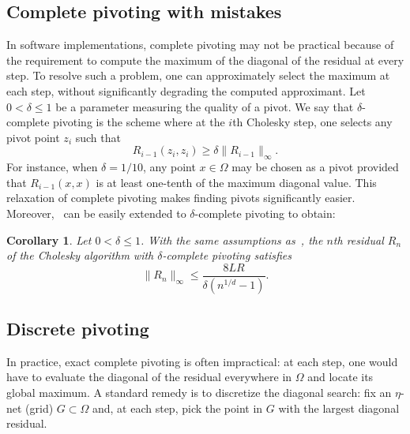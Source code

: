 \documentclass{amsart}
\newtheorem{corollary}{Corollary}[section]
\theoremstyle{definition}
\theoremstyle{remark}
\begin{document}
\subsection{Complete pivoting with mistakes}\label{sec:completePivotingWithMistakes}
In software implementations, complete pivoting may not be practical because of the requirement to compute the maximum of the diagonal of the residual at every step. To resolve such a problem, one can approximately select the maximum at each step, without significantly degrading the computed approximant.
Let $0<\delta\leq 1$ be a parameter measuring the quality of a pivot. We say that $\delta$-complete pivoting is the scheme where at the $i$th Cholesky step, one selects any pivot point $z_i$ such that 
\[
R_{i-1}(z_i, z_i) \geq \delta \| R_{i-1}\|_{\infty}.
\]
For instance, when $\delta=1/10$, any point $x\in\Omega$ may be chosen as a pivot provided that $R_{i-1}(x,x)$ is at least one-tenth of the maximum diagonal value. This relaxation of complete pivoting makes finding pivots significantly easier. Moreover,~ can be easily extended to $\delta$-complete pivoting to obtain: 

\begin{corollary}
    Let $0< \delta \leq 1$. With the same assumptions as~, the $n$th residual $R_n$ of the Cholesky algorithm with $\delta$-complete pivoting satisfies
    \begin{equation*}
        \|R_n\|_{\infty} \leq \frac{8 LR}{\delta(n^{1/d}-1)}.
    \end{equation*}
\end{corollary}

\subsection{Discrete pivoting}\label{sec:discretepivoting}

In practice, exact complete pivoting is often impractical: at each step, one would have to evaluate the diagonal of the residual everywhere in $\Omega$ and locate its global maximum. A standard remedy is to discretize the diagonal search: fix an $\eta$-net (grid) $G\subset\Omega$ and, at each step, pick the point in $G$ with the largest diagonal residual.
\end{document}
